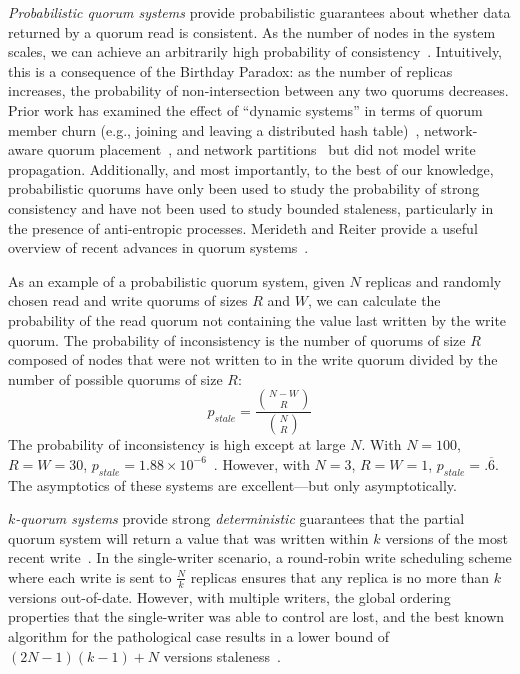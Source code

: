 \documentclass{vldb}
\begin{document}
\textit{Probabilistic quorum systems} provide probabilistic guarantees
about whether data returned by a quorum read is consistent.  As the
number of nodes in the system scales, we can achieve an arbitrarily
high probability of consistency~\cite{prob-quorum}.  Intuitively, this
is a consequence of the Birthday Paradox: as the number of replicas
increases, the probability of non-intersection between any two quorums
decreases.  Prior work has examined the effect of ``dynamic systems''
in terms of quorum member churn (e.g., joining and leaving a
distributed hash table)~\cite{prob-quorum-dynamic}, network-aware
quorum placement~\cite{delay-quorum, quorum-placement}, and network
partitions~\cite{partitionedquorum} but did not model write
propagation. Additionally, and most importantly, to the best of our
knowledge, probabilistic quorums have only been used to study the
probability of strong consistency and have not been used to study
bounded staleness, particularly in the presence of anti-entropic
processes.  Merideth and Reiter provide a useful overview of recent
advances in quorum systems~\cite{quorum-overview}.

As an example of a probabilistic quorum system, given $N$ replicas and
randomly chosen read and write quorums of sizes $R$ and $W$, we can
calculate the probability of the read quorum not containing the value
last written by the write quorum.  The probability of inconsistency is
the number of quorums of size $R$ composed of nodes that were not
written to in the write quorum divided by the number of possible
quorums of size $R$:
\begin{equation}
\label{eq:prob-strict}
p_{stale}=\frac{{N-W \choose R}}{{N \choose R}}
\end{equation}
The probability of inconsistency is high except at large $N$.  With
$N=100$, $R=W=30$, $p_{stale} = 1.88 \times
10^{-6}$~\cite{non-strict}.  However, with $N=3$, $R=W=1$, $p_{stale}
= .\overline{6}$.  The asymptotics of these systems are
excellent---but only asymptotically.

\textit{$k$-quorum systems} provide strong \textit{deterministic}
guarantees that the partial quorum system will return a value that was
written within $k$ versions of the most recent
write~\cite{non-strict}.  In the single-writer scenario, a round-robin
write scheduling scheme where each write is sent to $\frac{N}{k}$
replicas ensures that any replica is no more than $k$ versions
out-of-date.  However, with multiple writers, the global ordering
properties that the single-writer was able to control are lost, and
the best known algorithm for the pathological case results in a lower
bound of $(2N-1)(k-1)+N$ versions staleness~\cite{multi-k-quorum}.
\end{document}
